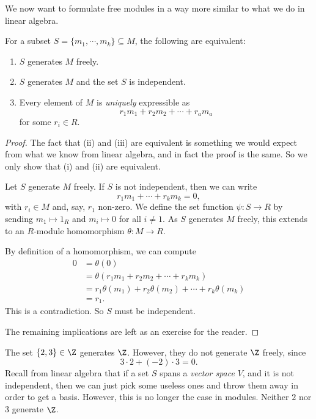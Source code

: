 \documentclass[a4paper]{article}
\begin{document}
We now want to formulate free modules in a way more similar to what we do in linear algebra.
\begin{prop}
  For a subset $S = \{m_1, \cdots, m_k\} \subseteq M$, the following are equivalent:
  \begin{enumerate}
    \item $S$ generates $M$ freely.
    \item $S$ generates $M$ and the set $S$ is independent.
    \item Every element of $M$ is \emph{uniquely} expressible as
      \[
        r_1 m_1 + r_2 m_2 + \cdots + r_a m_a
      \]
      for some $r_i \in R$.
  \end{enumerate}
\end{prop}
\begin{proof}
  The fact that (ii) and (iii) are equivalent is something we would expect from what we know from linear algebra, and in fact the proof is the same. So we only show that (i) and (ii) are equivalent.

  Let $S$ generate $M$ freely. If $S$ is not independent, then we can write
  \[
    r_1 m_1 + \cdots + r_k m_k = 0,
  \]
  with $r_i \in M$ and, say, $r_1$ non-zero. We define the set function $\psi: S \to R$ by sending $m_1 \mapsto 1_R$ and $m_i \mapsto 0$ for all $i \not= 1$. As $S$ generates $M$ freely, this extends to an $R$-module homomorphism $\theta: M \to R$.

  By definition of a homomorphism, we can compute
  \begin{align*}
    0 &= \theta(0)\\
    &= \theta(r_1 m_1 + r_2 m_2 + \cdots + r_k m_k) \\
    &= r_1\theta(m_1) + r_2 \theta(m_2) + \cdots + r_k \theta(m_k)\\
    &= r_1.
  \end{align*}
  This is a contradiction. So $S$ must be independent.

  The remaining implications are left as an exercise for the reader. %
\end{proof}

\begin{eg}
  The set $\{2, 3\} \in \Z$ generates $\Z$. However, they do not generate $\Z$ freely, since
  \[
    3\cdot 2 + (-2) \cdot 3 = 0.
  \]
  Recall from linear algebra that if a set $S$ spans a \emph{vector space} $V$, and it is not independent, then we can just pick some useless ones and throw them away in order to get a basis. However, this is no longer the case in modules. Neither $2$ nor $3$ generate $\Z$.
\end{eg}
\end{document}
